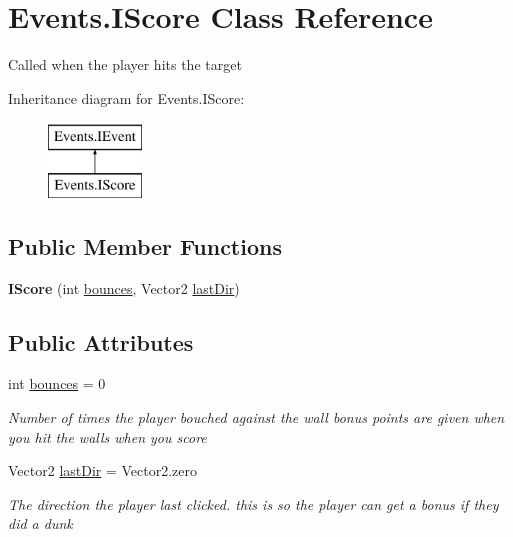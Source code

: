 \hypertarget{class_events_1_1_i_score}{}\section{Events.\+I\+Score Class Reference}
\label{class_events_1_1_i_score}


Called when the player hits the target  


Inheritance diagram for Events.\+I\+Score\+:\begin{figure}[H]
\begin{center}
\leavevmode
\includegraphics[height=2.000000cm]{class_events_1_1_i_score}
\end{center}
\end{figure}
\subsection*{Public Member Functions}
\begin{DoxyCompactItemize}
\item 
{\bfseries I\+Score} (int \hyperlink{class_events_1_1_i_score_a15ecb3ea31e60c28e8be9bbe8f183409}{bounces}, Vector2 \hyperlink{class_events_1_1_i_score_a2ea657fdd7f72f26c59e92ee71d275d9}{last\+Dir})\hypertarget{class_events_1_1_i_score_ad8997c6b85ecee3394bae7f95cec9113}{}\label{class_events_1_1_i_score_ad8997c6b85ecee3394bae7f95cec9113}

\end{DoxyCompactItemize}
\subsection*{Public Attributes}
\begin{DoxyCompactItemize}
\item 
int \hyperlink{class_events_1_1_i_score_a15ecb3ea31e60c28e8be9bbe8f183409}{bounces} = 0
\begin{DoxyCompactList}\small\item\em Number of times the player bouched against the wall bonus points are given when you hit the walls when you score \end{DoxyCompactList}\item 
Vector2 \hyperlink{class_events_1_1_i_score_a2ea657fdd7f72f26c59e92ee71d275d9}{last\+Dir} = Vector2.\+zero
\begin{DoxyCompactList}\small\item\em The direction the player last clicked. this is so the player can get a bonus if they did a dunk \end{DoxyCompactList}\end{DoxyCompactItemize}



